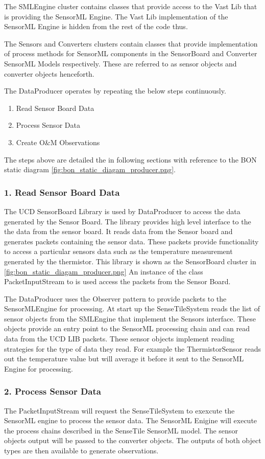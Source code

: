\documentclass[]{final_report}
\begin{document}
The SMLEngine cluster contains classes that provide access to
the Vast Lib that is providing the SensorML Engine.  The Vast Lib implementation
of the SensorML Engine is hidden from the rest of the code thus.

The Sensors and Converters clusters contain classes that provide
implementation of process methods for SensorML components in the SensorBoard and
Converter SensorML Models respectively. These are referred to as sensor objects and
converter objects henceforth.

The DataProducer operates by repeating the below steps continuously.
 \begin{enumerate}
\item Read Sensor Board Data
\item Process Sensor Data
\item Create O\&M Observations
\end{enumerate}
The steps above are detailed the in following sections with reference
to the BON static diagram \ref{fig:bon_static_diagam_producer.png}.

\subsubsection {1. Read Sensor Board Data}

The UCD SensorBoard Library is used by DataProducer to access
the data generated by the Sensor Board.
The library provides high level interface to the
the data from the sensor board. It reads data from the Sensor board and generates packets
containing the sensor data. These packets provide functionality
to access a particular sensors data such as the temperature
measurement generated by the thermistor. 
This library is shown as the SensorBoard cluster in \ref{fig:bon_static_diagam_producer.png}
An instance of the class PacketInputStream to is used access the packets from the Sensor Board.

The DataProducer uses the Observer pattern to provide
packets to the SensorMLEngine for processing.
At start up the SenseTileSystem reads the list of sensor objects from the SMLEngine that
implement the Sensors interface. These objects provide an entry point
to the SensorML processing chain and can read data from the UCD LIB packets.
These sensor objects implement reading strategies for the type of data they read. 
For example the ThermistorSensor reads out the temperature value
but will average it before it sent to the SensorML Engine for processing.

\subsubsection {2. Process Sensor Data}
The PacketInputStream will request the SenseTileSystem to exexcute
the SensorML engine to process the sensor data. The SensorML Enigine
will execute the process chains described in the SenseTile SensorML model.
The sensor objects output will be passed to the converter objects. The
outputs of both object types are then available to generate observations.
\end{document}
